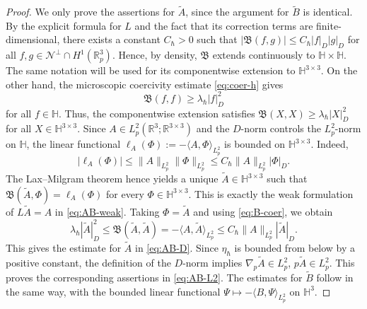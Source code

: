 \documentclass[10pt,reqno]{amsart}
\numberwithin{equation}{section}
\newcommand{\lt}{\left}
\newcommand{\rt}{\right}
\newcommand{\lal}{\langle}
\newcommand{\ral}{\rangle}
\newcommand{\R}{\mathbb R}
\newcommand{\bq}{\begin{equation}}
\newcommand{\eq}{\end{equation}}
\newcommand{\calN}{\mathcal N}
\begin{document}
\begin{proof}
We only prove the assertions for $\widetilde A$, since the argument for
$\widetilde B$ is identical. By the explicit formula for $L$ and the fact that its correction terms are finite-dimensional, there exists a constant $C_\hbar>0$ such that $\lt| \mathfrak{B}(f,g) \rt| \le C_\hbar |f|_D |g|_D$ for all $f,g\in\calN^\perp\cap H^1(\R^3_p)$. Hence, by density, $\mathfrak{B}$ extends continuously to $\mathbb{H}\times\mathbb{H}$. The same notation will be used for its componentwise extension to $\mathbb{H}^{3\times3}$. On the other hand, the microscopic coercivity estimate \eqref{eq:coer-h} gives
\bq\label{eq:B-coer}
\mathfrak{B}(f,f) \ge \lambda_\hbar |f|_D^2
\eq
for all $f\in\mathbb{H}$. Thus, the componentwise extension satisfies $\mathfrak{B}(X,X)\ge\lambda_\hbar |X|_D^2$ for all $X\in\mathbb{H}^{3\times3}$. Since $A\in L^2_p(\R^3;\R^{3\times3})$ and the $D$-norm controls the $L^2_p$-norm on $\mathbb{H}$, the linear functional $\ell_A(\Phi):=-\lal A,\Phi\ral_{L^2_p}$ is bounded on $\mathbb{H}^{3\times3}$. Indeed,
\[
|\ell_A(\Phi)| \le \|A\|_{L^2_p} \|\Phi\|_{L^2_p} \le C_\hbar \|A\|_{L^2_p} |\Phi|_D.
\]
The Lax--Milgram theorem hence yields a unique $\widetilde A\in\mathbb{H}^{3\times3}$ such that $\mathfrak{B}(\widetilde A,\Phi)=\ell_A(\Phi)$ for every $\Phi\in\mathbb{H}^{3\times3}$. This is exactly the weak formulation of $L\widetilde A=A$ in \eqref{eq:AB-weak}. Taking $\Phi=\widetilde A$ and using \eqref{eq:B-coer}, we obtain
\[
\lambda_\hbar |\widetilde A|_D^2 \le \mathfrak{B}(\widetilde A,\widetilde A) = -\lal A,\widetilde A\ral_{L^2_p} \le C_\hbar \|A\|_{L^2_p}|\widetilde A|_D.
\]
This gives the estimate for $\widetilde A$ in \eqref{eq:AB-D}. Since $\eta_\hbar$ is bounded from below by a positive constant, the definition of the $D$-norm implies $\nabla_p \widetilde A \in L^2_p$, $p\widetilde A\in L^2_p$. This proves the corresponding assertions in \eqref{eq:AB-L2}. The estimates for $\widetilde B$ follow in the same way, with the bounded linear functional $\Psi\mapsto-\lal B,\Psi\ral_{L^2_p}$ on $\mathbb{H}^3$.


\end{proof}
\end{document}
